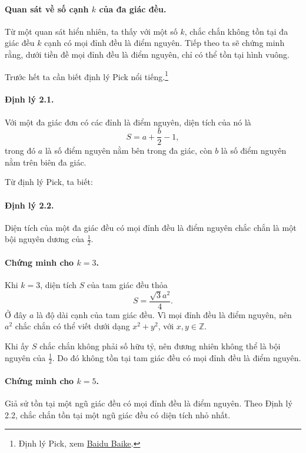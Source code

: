 \documentclass[11pt]{article}
\begin{document}
\paragraph{Quan sát về số cạnh \(k\) của đa giác đều.}
Từ một quan sát hiển nhiên, ta thấy với một số \(k\), chắc chắn không tồn tại
đa giác đều \(k\) cạnh có mọi đỉnh đều là điểm nguyên. Tiếp theo ta sẽ chứng
minh rằng, dưới tiền đề mọi đỉnh đều là điểm nguyên, chỉ có thể tồn tại hình
vuông.

Trước hết ta cần biết định lý Pick nổi tiếng.\footnote{Định lý Pick, xem
\href{http://baike.baidu.com/link?url=YPZMMmQnYxImXzLGXu2CGC3QJoAFrs-Qvy7KyfwPzcoQsiQ88zfXk30nT3rgCYmg5TPu25m5JiDXKQIodxUYshIoByRwxJEFuFkn9q}{Baidu
Baike}.}

\paragraph{Định lý 2.1.}
Với một đa giác đơn có các đỉnh là điểm nguyên, diện tích của nó là
\[
  S=a+\frac{b}{2}-1,
\]
trong đó \(a\) là số điểm nguyên nằm bên trong đa giác, còn \(b\) là số điểm
nguyên nằm trên biên đa giác.

Từ định lý Pick, ta biết:

\paragraph{Định lý 2.2.}
Diện tích của một đa giác đều có mọi đỉnh đều là điểm nguyên chắc chắn là một
bội nguyên dương của \(\frac12\).

\paragraph{Chứng minh cho \(k=3\).}
Khi \(k=3\), diện tích \(S\) của tam giác đều thỏa
\[
  S=\frac{\sqrt{3}a^2}{4}.
\]
Ở đây \(a\) là độ dài cạnh của tam giác đều. Vì mọi đỉnh đều là điểm nguyên,
nên \(a^2\) chắc chắn có thể viết dưới dạng \(x^2+y^2\), với \(x,y\in\mathbb Z\).

Khi ấy \(S\) chắc chắn không phải số hữu tỷ, nên đương nhiên không thể là bội
nguyên của \(\frac12\). Do đó không tồn tại tam giác đều có mọi đỉnh đều là
điểm nguyên.

\paragraph{Chứng minh cho \(k=5\).}
Giả sử tồn tại một ngũ giác đều có mọi đỉnh đều là điểm nguyên. Theo Định lý
2.2, chắc chắn tồn tại một ngũ giác đều có diện tích nhỏ nhất.
\end{document}
